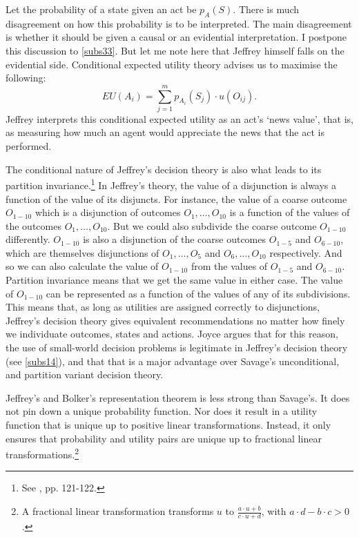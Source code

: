Let the probability of a state given an act be $p_{A} (S)$. There is much disagreement on how this probability is to be interpreted. The main disagreement is whether it should be given a causal or an evidential interpretation. I postpone this discussion to \autoref{subs33}. But let me note here that Jeffrey himself falls on the evidential side. Conditional expected utility theory advises us to maximise the following:
$$EU(A_{i}) = \sum\limits_{j=1}^m p_{A_i} (S_j) \cdot u (O_{ij}).$$
Jeffrey interprets this conditional expected utility as an act's `news value', that is, as measuring how much an agent would appreciate the news that the act is performed.

The conditional nature of Jeffrey's decision theory is also what leads to its partition invariance.\footnote{See \citet{Joyce1999}, pp. 121-122.} In Jeffrey's theory, the value of a disjunction is always a function of the value of its disjuncts. For instance, the value of a coarse outcome $O_{1-10}$ which is a disjunction of outcomes $O_1,\ldots,O_{10}$ is a function of the values of the outcomes $O_1,\ldots, O_{10}$. But we could also subdivide the coarse outcome $O_{1-10}$ differently. $O_{1-10}$ is also a disjunction of the coarse outcomes $O_{1-5}$ and $O_{6-10}$, which are themselves disjunctions of $O_1,\ldots,O_5$ and $O_6,\ldots,O_{10}$ respectively. And so we can also calculate the value of $O_{1-10}$ from the values of $O_{1-5}$ and $O_{6-10}$. Partition invariance means that we get the same value in either case. The value of $O_{1-10}$ can be represented as a function of the values of any of its subdivisions. This means that, as long as utilities are assigned correctly to disjunctions, Jeffrey's decision theory gives equivalent recommendations no matter how finely we individuate outcomes, states and actions. Joyce argues that for this reason, the use of small-world decision problems is legitimate in Jeffrey's decision theory (see \autoref{subs14}), and that that is a major advantage over Savage's unconditional, and partition variant decision theory.

Jeffrey's and Bolker's representation theorem is less strong than Savage's. It does not pin down a unique probability function. Nor does it result in a utility function that is unique up to positive linear transformations. Instead, it only ensures that probability and utility pairs are unique up to fractional linear transformations.\footnote{A fractional linear transformation transforms $u$ to $\frac{a \cdot u + b}{c \cdot u + d}$, with $a \cdot d - b \cdot c > 0$.}

